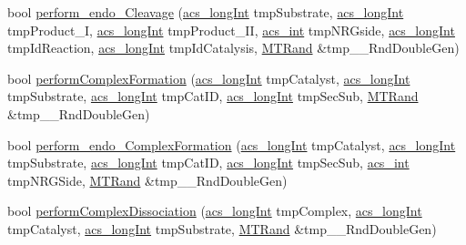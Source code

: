 \begin{DoxyCompactItemize}
\item 
bool \hyperlink{classenvironment_ade26b82a3b48a5bda7e5751cbfd31b04}{perform\-\_\-endo\-\_\-\-Cleavage} (\hyperlink{acs__headers_8h_a19319d75f02db4308bc5c0026d98cd85}{acs\-\_\-long\-Int} tmp\-Substrate, \hyperlink{acs__headers_8h_a19319d75f02db4308bc5c0026d98cd85}{acs\-\_\-long\-Int} tmp\-Product\-\_\-\-I, \hyperlink{acs__headers_8h_a19319d75f02db4308bc5c0026d98cd85}{acs\-\_\-long\-Int} tmp\-Product\-\_\-\-I\-I, \hyperlink{acs__headers_8h_a8d277355641a098190360234e2ebde35}{acs\-\_\-int} tmp\-N\-R\-Gside, \hyperlink{acs__headers_8h_a19319d75f02db4308bc5c0026d98cd85}{acs\-\_\-long\-Int} tmp\-Id\-Reaction, \hyperlink{acs__headers_8h_a19319d75f02db4308bc5c0026d98cd85}{acs\-\_\-long\-Int} tmp\-Id\-Catalysis, \hyperlink{class_m_t_rand}{M\-T\-Rand} \&tmp\-\_\-\-\_\-\-Rnd\-Double\-Gen)
\item 
bool \hyperlink{classenvironment_aaf4f4f6be28edb182d2a2516c9394f9b}{perform\-Complex\-Formation} (\hyperlink{acs__headers_8h_a19319d75f02db4308bc5c0026d98cd85}{acs\-\_\-long\-Int} tmp\-Catalyst, \hyperlink{acs__headers_8h_a19319d75f02db4308bc5c0026d98cd85}{acs\-\_\-long\-Int} tmp\-Substrate, \hyperlink{acs__headers_8h_a19319d75f02db4308bc5c0026d98cd85}{acs\-\_\-long\-Int} tmp\-Cat\-I\-D, \hyperlink{acs__headers_8h_a19319d75f02db4308bc5c0026d98cd85}{acs\-\_\-long\-Int} tmp\-Sec\-Sub, \hyperlink{class_m_t_rand}{M\-T\-Rand} \&tmp\-\_\-\-\_\-\-Rnd\-Double\-Gen)
\item 
bool \hyperlink{classenvironment_ae942db2453c56b60250a5d43452b91a5}{perform\-\_\-endo\-\_\-\-Complex\-Formation} (\hyperlink{acs__headers_8h_a19319d75f02db4308bc5c0026d98cd85}{acs\-\_\-long\-Int} tmp\-Catalyst, \hyperlink{acs__headers_8h_a19319d75f02db4308bc5c0026d98cd85}{acs\-\_\-long\-Int} tmp\-Substrate, \hyperlink{acs__headers_8h_a19319d75f02db4308bc5c0026d98cd85}{acs\-\_\-long\-Int} tmp\-Cat\-I\-D, \hyperlink{acs__headers_8h_a19319d75f02db4308bc5c0026d98cd85}{acs\-\_\-long\-Int} tmp\-Sec\-Sub, \hyperlink{acs__headers_8h_a8d277355641a098190360234e2ebde35}{acs\-\_\-int} tmp\-N\-R\-G\-Side, \hyperlink{class_m_t_rand}{M\-T\-Rand} \&tmp\-\_\-\-\_\-\-Rnd\-Double\-Gen)
\item 
bool \hyperlink{classenvironment_a5c5e57b0558067cbf55c894f33d0a121}{perform\-Complex\-Dissociation} (\hyperlink{acs__headers_8h_a19319d75f02db4308bc5c0026d98cd85}{acs\-\_\-long\-Int} tmp\-Complex, \hyperlink{acs__headers_8h_a19319d75f02db4308bc5c0026d98cd85}{acs\-\_\-long\-Int} tmp\-Catalyst, \hyperlink{acs__headers_8h_a19319d75f02db4308bc5c0026d98cd85}{acs\-\_\-long\-Int} tmp\-Substrate, \hyperlink{class_m_t_rand}{M\-T\-Rand} \&tmp\-\_\-\-\_\-\-Rnd\-Double\-Gen)

\end{DoxyCompactItemize}
